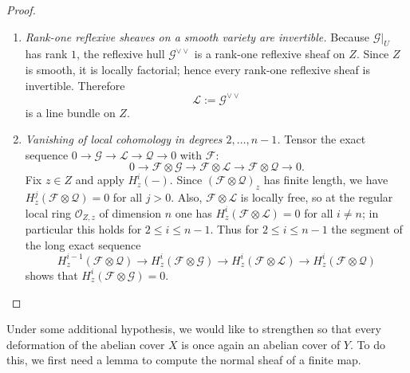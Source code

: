 \documentclass[12pt,twoside,]{amsart}
\theoremstyle{plain}
\theoremstyle{definition}
\begin{document}
\begin{proof}
\begin{enumerate}
\item\emph{Rank-one reflexive sheaves on a smooth variety are invertible.}
Because $\mathcal G|_U$ has rank $1$, the reflexive hull $\mathcal G^{\vee\vee}$ is a
rank-one reflexive sheaf on $Z$. Since $Z$ is smooth, it is locally factorial; hence
every rank-one reflexive sheaf is invertible. Therefore
\[
\mathcal L:=\mathcal G^{\vee\vee}
\]
is a line bundle on $Z$.

\item\emph{Vanishing of local cohomology in degrees $2,\dots,n-1$.}
Tensor the exact sequence
$0\to \mathcal G\to \mathcal L\to \mathcal Q\to 0$ with $\mathcal F$:
\[
0\to \mathcal F\otimes \mathcal G \to \mathcal F\otimes \mathcal L \to \mathcal F\otimes \mathcal Q \to 0.
\]
Fix $z\in Z$ and apply $H^i_z(-)$.
Since $(\mathcal F\otimes \mathcal Q)_z$ has finite length, we have
$H^j_z(\mathcal F\otimes \mathcal Q)=0$ for all $j>0$.
Also, $\mathcal F\otimes \mathcal L$ is locally free, so at the regular local ring
$\mathcal O_{Z,z}$ of dimension $n$ one has
$H^i_z(\mathcal F\otimes \mathcal L)=0$ for all $i\neq n$; in particular this holds
for $2\le i\le n-1$.
Thus for $2\le i\le n-1$ the segment of the long exact sequence
\[
H^{i-1}_z(\mathcal F\otimes \mathcal Q)\to
H^i_z(\mathcal F\otimes \mathcal G)\to
H^i_z(\mathcal F\otimes \mathcal L)\to
H^i_z(\mathcal F\otimes \mathcal Q)
\]
shows that $H^i_z(\mathcal F\otimes \mathcal G)=0$.

\end{enumerate}
\end{proof}



\medskip

Under some additional hypothesis, we would like to strengthen  so that every deformation of the abelian cover $X$ is once again an abelian cover of $Y$. To do this, we first need a lemma to compute the normal sheaf of a finite map.
\end{document}
